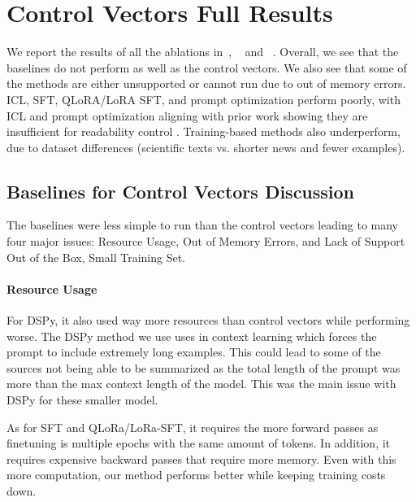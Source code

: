 
\section{Control Vectors Full Results}\label{appendix:ch-4-full-results}
We report the results of all the ablations in~, ~ and ~. Overall, we see that the baselines do not perform as well as the control vectors. We also see that some of the methods are either unsupported or cannot run due to out of memory errors. ICL, SFT, QLoRA/LoRA SFT, and prompt optimization perform poorly, with ICL and prompt optimization aligning with prior work showing they are insufficient for readability control \cite{ribeiro-etal-2023-generating}. Training-based methods also underperform, due to dataset differences (scientific texts vs. shorter news and fewer examples). 


\subsection{Baselines for Control Vectors Discussion}\label{appendix:chap-4-baseline-discussion}
The baselines were less simple to run than the control vectors leading to many four major issues: Resource Usage, Out of Memory Errors, and Lack of Support Out of the Box, Small Training Set. 
\paragraph{Resource Usage}
For DSPy, it also used way more resources than control vectors while performing worse. The DSPy method we use uses in context learning which forces the prompt to include extremely long examples. This could lead to some of the sources not being able to be summarized as the total length of the prompt was more than the max context length of the model. This was the main issue with DSPy for these smaller model. 

As for SFT and QLoRa/LoRa-SFT, it requires the more forward passes as finetuning is multiple epochs with the same amount of tokens. In addition, it requires expensive backward passes that require more memory. Even with this more computation, our method performs better while keeping training costs down. 
